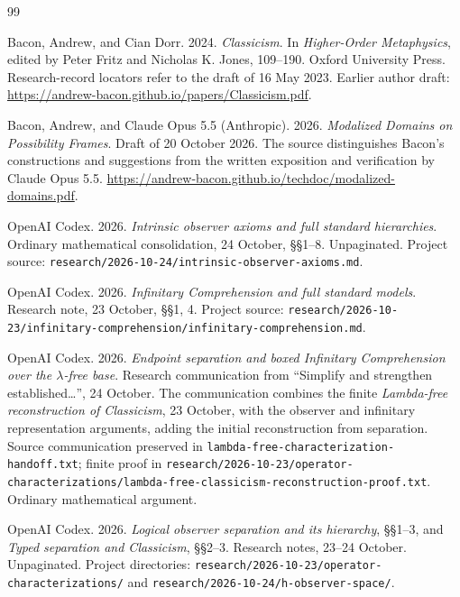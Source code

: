 \documentclass[12pt,letterpaper]{article}
\begin{document}
\begin{thebibliography}{99}
\raggedright
{}
Bacon, Andrew, and Cian Dorr. 2024. \emph{Classicism}.
In \emph{Higher-Order Metaphysics}, edited by Peter Fritz and Nicholas K. Jones, 109--190. Oxford University Press.
Research-record locators refer to the draft of 16 May 2023.
Earlier author draft: \url{https://andrew-bacon.github.io/papers/Classicism.pdf}.

Bacon, Andrew, and Claude Opus 5.5 (Anthropic). 2026.
\emph{Modalized Domains on Possibility Frames}. Draft of 20 October 2026.
The source distinguishes Bacon's constructions and suggestions from the written exposition and verification by Claude Opus 5.5.
\url{https://andrew-bacon.github.io/techdoc/modalized-domains.pdf}.

OpenAI Codex. 2026. \emph{Intrinsic observer axioms and full standard hierarchies}. Ordinary mathematical consolidation, 24 October, \S\S1--8. Unpaginated. Project source: \nolinkurl{research/2026-10-24/intrinsic-observer-axioms.md}.

OpenAI Codex. 2026. \emph{Infinitary Comprehension and full standard models}. Research note, 23 October, \S\S1, 4. Project source: \nolinkurl{research/2026-10-23/infinitary-comprehension/infinitary-comprehension.md}.

OpenAI Codex. 2026. \emph{Endpoint separation and boxed Infinitary Comprehension over the $\lambda$-free base}. Research communication from ``Simplify and strengthen established\ldots'', 24 October. The communication combines the finite \emph{Lambda-free reconstruction of Classicism}, 23 October, with the observer and infinitary representation arguments, adding the initial reconstruction from separation. Source communication preserved in \nolinkurl{lambda-free-characterization-handoff.txt}; finite proof in \nolinkurl{research/2026-10-23/operator-characterizations/lambda-free-classicism-reconstruction-proof.txt}. Ordinary mathematical argument.

OpenAI Codex. 2026. \emph{Logical observer separation and its hierarchy}, \S\S1--3, and \emph{Typed separation and Classicism}, \S\S2--3. Research notes, 23--24 October. Unpaginated. Project directories: \nolinkurl{research/2026-10-23/operator-characterizations/} and \nolinkurl{research/2026-10-24/h-observer-space/}.


\end{thebibliography}
\end{document}
